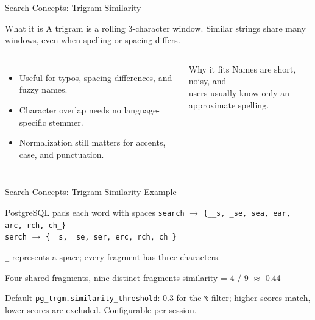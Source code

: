 \documentclass[aspectratio=169]{beamer}
\begin{document}
\begin{frame}{Search Concepts: Trigram Similarity}
  \begin{block}{What it is}
    A trigram is a rolling 3-character window. Similar strings share many windows, even when spelling or spacing differs.
  \end{block}

  \begin{columns}[T,totalwidth=\textwidth]
      \begin{itemize}
        \item Useful for typos, spacing differences, and fuzzy names.
        \item Character overlap needs no language-specific stemmer.
        \item Normalization still matters for accents, case, and punctuation.
      \end{itemize}

      \begin{block}{Why it fits}
        \centering
        \large Names are short, noisy, and\\[0.12cm]
        users usually know only an approximate spelling.
      \end{block}
  \end{columns}
\end{frame}

\begin{frame}{Search Concepts: Trigram Similarity Example}
  \begin{exampleblock}{PostgreSQL pads each word with spaces}
    \texttt{search} $\rightarrow$ \texttt{\{\_\_s, \_se, sea, ear, arc, rch, ch\_\}}\\[0.2cm]
    \texttt{serch} $\rightarrow$ \texttt{\{\_\_s, \_se, ser, erc, rch, ch\_\}}
  \end{exampleblock}
  \small \texttt{\_} represents a space; every fragment has three characters.
  \vspace{0.3cm}
  \begin{block}{Four shared fragments, nine distinct fragments}
    \centering \Large similarity = 4 / 9 $\approx$ 0.44
  \end{block}
  {\scriptsize\textcolor{MutedText}{Default \texttt{pg\_trgm.similarity\_threshold}: 0.3 for the \texttt{\%} filter; higher scores match, lower scores are excluded. Configurable per session.}}
\end{frame}
\end{document}
